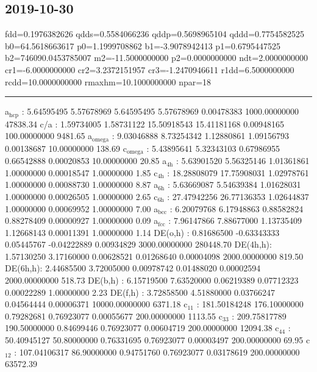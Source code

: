 \documentclass[11pt]{article}
\begin{document}
\subsection{2019-10-30}
\label{sec:orgbd16dde}
fdd=0.1976382626 qdds=0.5584066236 qddp=0.5698965104 qddd=0.7754582525 b0=64.5618663617 p0=1.1999708862 b1=-3.9078942413 p1=0.6795447525 b2=746090.0453785007 m2=-11.5000000000 p2=0.0000000000 ndt=2.0000000000 cr1=-6.0000000000 cr2=3.2372151957 cr3=-1.2470946611 r1dd=6.5000000000 rcdd=10.0000000000 rmaxhm=10.1000000000 npar=18 

\noindent\rule{\textwidth}{0.5pt}
a\(_{\text{hcp}}\)   :   5.64595495   5.57678969   5.64595495   5.57678969   0.00478383 1000.00000000     47838.34
c/a     :   1.59734005   1.58731122  15.50918543  15.41181168   0.00948165 100.00000000      9481.65
a\(_{\text{omega}}\) :   9.03046888   8.73254342   1.12880861   1.09156793   0.00138687  10.00000000       138.69
c\(_{\text{omega}}\) :   5.43895641   5.32343103   0.67986955   0.66542888   0.00020853  10.00000000        20.85
a\(_{\text{4h}}\)    :   5.63901520   5.56325146   1.01361861   1.00000000   0.00018547   1.00000000         1.85
c\(_{\text{4h}}\)    :  18.28808079  17.75908031   1.02978761   1.00000000   0.00088730   1.00000000         8.87
a\(_{\text{6h}}\)    :   5.63669087   5.54639384   1.01628031   1.00000000   0.00026505   1.00000000         2.65
c\(_{\text{6h}}\)    :  27.47942256  26.77136353   1.02644837   1.00000000   0.00069952   1.00000000         7.00
a\(_{\text{bcc}}\)   :   6.20079768   6.17948863   0.88582824   0.88278409   0.00000927   1.00000000         0.09
a\(_{\text{fcc}}\)   :   7.96147866   7.88677000   1.13735409   1.12668143   0.00011391   1.00000000         1.14
DE(o,h) :   0.81686500  -0.63343333   0.05445767  -0.04222889   0.00934829 3000.00000000    280448.70
DE(4h,h):   1.57130250   3.17160000   0.00628521   0.01268640   0.00004098 2000.00000000       819.50
DE(6h,h):   2.44685500   3.72005000   0.00978742   0.01488020   0.00002594 2000.00000000       518.73
DE(b,h) :   6.15719500   7.63520000   0.06219389   0.07712323   0.00022289   1.00000000         2.23
DE(f,h) :   3.72858500   4.51880000   0.03766247   0.04564444   0.00006371 10000.00000000      6371.18
c\(_{\text{11}}\)    : 181.50184248 176.10000000   0.79282681   0.76923077   0.00055677 200.00000000      1113.55
c\(_{\text{33}}\)    : 209.75817789 190.50000000   0.84699446   0.76923077   0.00604719 200.00000000     12094.38
c\(_{\text{44}}\)    :  50.40945127  50.80000000   0.76331695   0.76923077   0.00003497 200.00000000        69.95
c\(_{\text{12}}\)    : 107.04106317  86.90000000   0.94751760   0.76923077   0.03178619 200.00000000     63572.39
\end{document}
